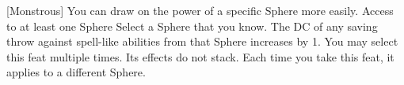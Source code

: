  {[Monstrous]}
\descfeat
{You can draw on the power of a specific Sphere more easily.}
{Access to at least one Sphere}
{Select a Sphere that you know.  The DC of any saving throw against spell-like abilities from that Sphere increases by 1.}
{You may select this feat multiple times.  Its effects do not stack.  Each time you take this feat, it applies to a different Sphere.}